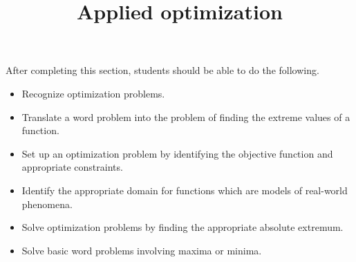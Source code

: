 \documentclass{ximera}
\title{Applied optimization}
\begin{document}
\begin{abstract}
\end{abstract}

\maketitle

\begin{sectionOutcomes}

After completing this section, students should be able to do the following.

\begin{itemize}
\item Recognize optimization problems.
\item Translate a word problem into the problem of finding the extreme values of a function.
\item Set up an optimization problem by identifying the objective function and appropriate constraints.
\item Identify the appropriate domain for functions which are models of real-world phenomena.   
\item Solve optimization problems by finding the appropriate absolute extremum.
\item Solve basic word problems involving maxima or minima.
\end{itemize}

\end{sectionOutcomes}
\end{document}
